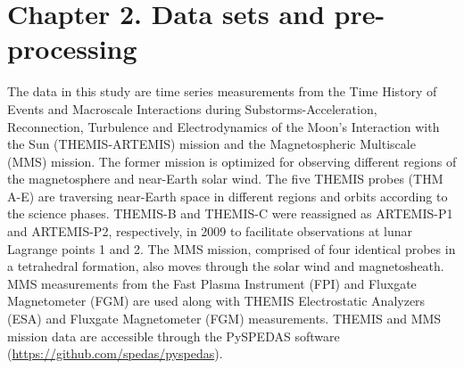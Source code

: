 \chapter{Chapter 2. Data sets and pre-processing}

The data in this study are time series measurements from the Time History of Events and Macroscale Interactions during Substorms-Acceleration, Reconnection, Turbulence and Electrodynamics of the Moon’s Interaction with the Sun (THEMIS-ARTEMIS) mission and the Magnetospheric Multiscale (MMS) mission. The former mission is optimized for observing different regions of the magnetosphere and near-Earth solar wind. The five THEMIS probes (THM A-E) are traversing near-Earth space in different regions and orbits according to the science phases. THEMIS-B and THEMIS-C were reassigned as ARTEMIS-P1 and ARTEMIS-P2, respectively, in 2009 to facilitate observations at lunar Lagrange points 1 and 2. The MMS mission, comprised of four identical probes in a tetrahedral formation, also moves through the solar wind and magnetosheath. MMS measurements from the Fast Plasma Instrument (FPI) \citep{Pollock:2016} and Fluxgate Magnetometer (FGM) \citep{Torbert:2016} are used along with THEMIS Electrostatic Analyzers (ESA) \citep{McFadden:2008} and Fluxgate Magnetometer (FGM) \citep{Auster:2008} measurements. THEMIS and MMS mission data are accessible through the PySPEDAS software (\url{https://github.com/spedas/pyspedas}).

